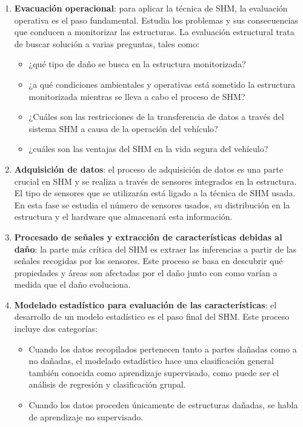 \begin{enumerate}
    \item \textbf{Evacuación operacional}: para aplicar la técnica de SHM, la evaluación operativa es el paso fundamental. Estudia los problemas y sus consecuencias que conducen a monitorizar las estructuras. La evaluación estructural trata de buscar solución a varias preguntas, tales como:
    \begin{itemize}
        \item[\tiny{\textbullet}] ¿qué tipo de daño se busca en la estructura monitorizada?
        \item[\tiny{\textbullet}] ¿a qué condiciones ambientales y operativas está sometido la estructura monitorizada mientras se lleva a cabo el proceso de SHM?
        \item[\tiny{\textbullet}] ¿Cuáles son las restricciones de la transferencia de datos a través del sistema SHM a causa de la operación del vehículo?
        \item[\tiny{\textbullet}] ¿cuáles son las ventajas del SHM en la vida segura del vehículo?
    \end{itemize}
    
    \item \textbf{Adquisición de datos}: el proceso de adquisición de datos es una parte crucial en SHM y se realiza a través de sensores integrados en la estructura. El tipo de sensores que se utilizarán está ligado a la técnica de SHM usada. En esta fase se estudia el número de sensores usados, su distribución en la estructura y  el hardware que almacenará esta información. 
    
    \item \textbf{Procesado de señales y extracción de características debidas al daño}: la parte más crítica del SHM es extraer las inferencias a partir de las señales recogidas por los sensores. Este proceso se basa en descubrir qué propiedades y áreas son afectadas por el daño junto con como varían a medida que el daño evoluciona.
    
    \item \textbf{Modelado estadístico para evaluación de las características}: el desarrollo de un modelo estadístico es el paso final del SHM. Este proceso incluye dos categorías:
    \begin{itemize}
        \item Cuando los datos recopilados pertenecen tanto a partes dañadas como a no dañadas, el modelado estadístico hace una clasificación general también conocida como aprendizaje supervisado, como puede ser el análisis de regresión y clasificación grupal.
        \item Cuando los datos proceden únicamente de estructuras dañadas, se habla de aprendizaje no supervisado.
    \end{itemize}
\end{enumerate} \vspace*{10pt}

